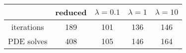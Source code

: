 \begin{tabular}{ccccc}
& reduced & $\lambda = 0.1$ & $\lambda = 1$ & $\lambda = 10$ \\
\hline
iterations & 189 & 101 & 136 & 146 \\
PDE solves & 408 & 105 & 146 & 164 \\
\hline
\end{tabular}
